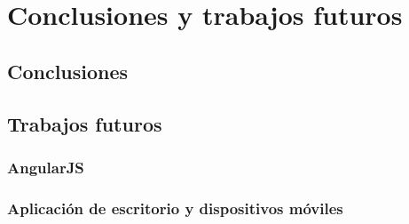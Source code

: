 \chapter{Conclusiones y trabajos futuros}
\label{cap:conclusiones}

\section{Conclusiones}

\section{Trabajos futuros}

\subsection{AngularJS}

\subsection{Aplicación de escritorio y dispositivos móviles}
